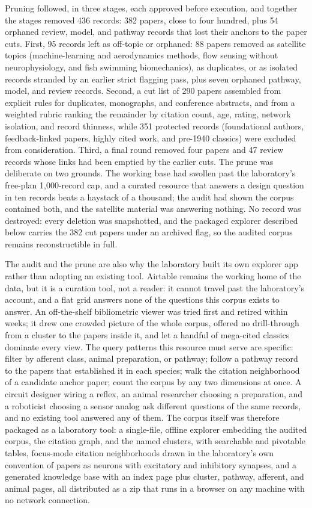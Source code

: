 Pruning followed, in three stages, each approved before execution, and together the stages removed 436 records: 382 papers, close to four hundred, plus 54 orphaned review, model, and pathway records that lost their anchors to the paper cuts. First, 95 records left as off-topic or orphaned: 88 papers removed as satellite topics (machine-learning and aerodynamics methods, flow sensing without neurophysiology, and fish swimming biomechanics), as duplicates, or as isolated records stranded by an earlier strict flagging pass, plus seven orphaned pathway, model, and review records. Second, a cut list of 290 papers assembled from explicit rules for duplicates, monographs, and conference abstracts, and from a weighted rubric ranking the remainder by citation count, age, rating, network isolation, and record thinness, while 351 protected records (foundational authors, feedback-linked papers, highly cited work, and pre-1940 classics) were excluded from consideration. Third, a final round removed four papers and 47 review records whose links had been emptied by the earlier cuts. The prune was deliberate on two grounds. The working base had swollen past the laboratory's free-plan 1,000-record cap, and a curated resource that answers a design question in ten records beats a haystack of a thousand; the audit had shown the corpus contained both, and the satellite material was answering nothing. No record was destroyed: every deletion was snapshotted, and the packaged explorer described below carries the 382 cut papers under an archived flag, so the audited corpus remains reconstructible in full.

The audit and the prune are also why the laboratory built its own explorer app rather than adopting an existing tool. Airtable remains the working home of the data, but it is a curation tool, not a reader: it cannot travel past the laboratory's account, and a flat grid answers none of the questions this corpus exists to answer. An off-the-shelf bibliometric viewer was tried first and retired within weeks; it drew one crowded picture of the whole corpus, offered no drill-through from a cluster to the papers inside it, and let a handful of mega-cited classics dominate every view. The query patterns this resource must serve are specific: filter by afferent class, animal preparation, or pathway; follow a pathway record to the papers that established it in each species; walk the citation neighborhood of a candidate anchor paper; count the corpus by any two dimensions at once. A circuit designer wiring a reflex, an animal researcher choosing a preparation, and a roboticist choosing a sensor analog ask different questions of the same records, and no existing tool answered any of them. The corpus itself was therefore packaged as a laboratory tool: a single-file, offline explorer embedding the audited corpus, the citation graph, and the named clusters, with searchable and pivotable tables, focus-mode citation neighborhoods drawn in the laboratory's own convention of papers as neurons with excitatory and inhibitory synapses, and a generated knowledge base with an index page plus cluster, pathway, afferent, and animal pages, all distributed as a zip that runs in a browser on any machine with no network connection.

